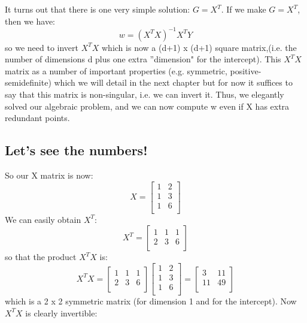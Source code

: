 It turns out that there is one very simple solution: $G = X^T$. If we make $G = X^T$, then we have:
\begin{equation}
w = (X^T X)^{-1} X^T Y 
\end{equation}
so we need to invert $X^T X$ which is now a (d+1) x (d+1) square matrix,(i.e. the number of dimensions d plus one extra ''dimension" for the intercept). This $X^T X$ matrix as a number of important properties (e.g. symmetric, positive-semidefinite) which we will detail in the next chapter but for now it suffices to say that  this matrix is non-singular, i.e. we can invert it. Thus, we elegantly solved our algebraic problem, and we can now compute w even if X has extra redundant points.

\subsection{Let's see the numbers!}
So our X matrix is now:
\begin{equation}
X = 
\begin{bmatrix}
1&2\\
1&3\\
1&6\\
\end{bmatrix}
\end{equation}
We can easily obtain $X^T$:
\begin{equation}
X^T=
\begin{bmatrix}
1& 1 &1\\
2& 3 &6\\
\end{bmatrix}
\end{equation}
so that the product $X^T X$ is:
\begin{equation}
X^T X=
\begin{bmatrix}
1& 1 &1\\
2& 3 &6\\
\end{bmatrix}
\begin{bmatrix}
1&2\\
1&3\\
1&6\\
\end{bmatrix}
= 
\begin{bmatrix}
3&11\\
11&49\\
\end{bmatrix}
\end{equation}
which is a 2 x 2 symmetric matrix (for dimension 1 and for the intercept). Now $X^T X$ is clearly invertible:
